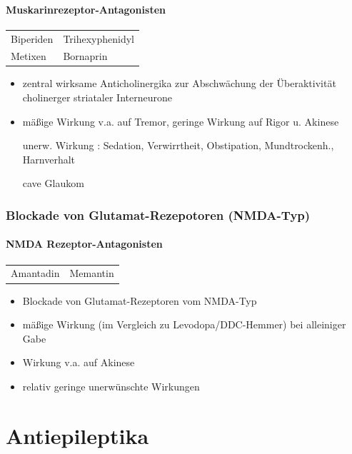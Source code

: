 \documentclass[10pt,a4paper]{report}
\begin{document}
\subsubsection{Muskarinrezeptor-Antagonisten} %
\label{ssub:muskarinrezeptor_antagonisten}
\begin{tabularx}{\textwidth}{XX}
Biperiden&Trihexyphenidyl\\
Metixen&Bornaprin\\
\end{tabularx}
\begin{itemize}
	\item zentral wirksame Anticholinergika zur Abschwächung der Überaktivität cholinerger striataler Interneurone
	\item mäßige Wirkung v.a. auf Tremor, geringe Wirkung auf Rigor u. Akinese 
	\item[unerw. Wirkung]: Sedation, Verwirrtheit, Obstipation, Mundtrockenh., Harnverhalt
	\item[cave] Glaukom
\end{itemize}
\subsection{Blockade von Glutamat-Rezepotoren (NMDA-Typ)} %
\label{sub:blockade_von_glutamat_rezepotoren_}
\subsubsection{NMDA Rezeptor-Antagonisten} %
\label{ssub:nmda_rezeptor_antagonisten}
\begin{tabularx}{\textwidth}{XX}
Amantadin&Memantin\\
\end{tabularx}
\begin{itemize}
	\item Blockade von Glutamat-Rezeptoren vom NMDA-Typ
	\item mäßige Wirkung (im Vergleich zu Levodopa/DDC-Hemmer) bei alleiniger Gabe
	\item Wirkung v.a. auf Akinese  
	\item relativ geringe unerwünschte Wirkungen
\end{itemize}
\chapter{Antiepileptika} %
\label{cha:antiepileptika}
\end{document}
